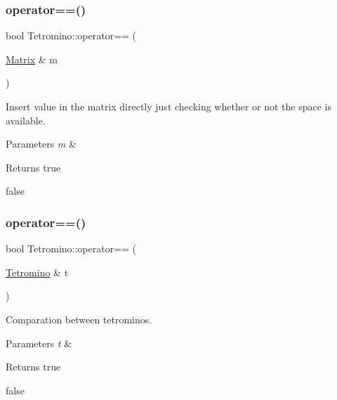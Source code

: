 \subsubsection{\texorpdfstring{operator==()}{operator==()}\hspace{0.1cm}{\footnotesize\ttfamily [1/2]}}
{\footnotesize\ttfamily bool Tetromino\+::operator== (\begin{DoxyParamCaption}\item[{\hyperlink{classMatrix}{Matrix} \&}]{m }\end{DoxyParamCaption})}



Insert value in the matrix directly just checking whether or not the space is available. 


\begin{DoxyParams}{Parameters}
{\em m} & \\
\hline
\end{DoxyParams}
\begin{DoxyReturn}{Returns}
true 

false 
\end{DoxyReturn}
\mbox{\label{classTetromino_a1fb3c6bd848e94e099f74b7267b09bb2}} 
\subsubsection{\texorpdfstring{operator==()}{operator==()}\hspace{0.1cm}{\footnotesize\ttfamily [2/2]}}
{\footnotesize\ttfamily bool Tetromino\+::operator== (\begin{DoxyParamCaption}\item[{\hyperlink{classTetromino}{Tetromino} \&}]{t }\end{DoxyParamCaption})}



Comparation between tetrominos. 


\begin{DoxyParams}{Parameters}
{\em t} & \\
\hline
\end{DoxyParams}
\begin{DoxyReturn}{Returns}
true 

false 
\end{DoxyReturn}
\mbox{\label{classTetromino_ac1de8d2bbc2e46ee5d5586f25dcd4692}} 
